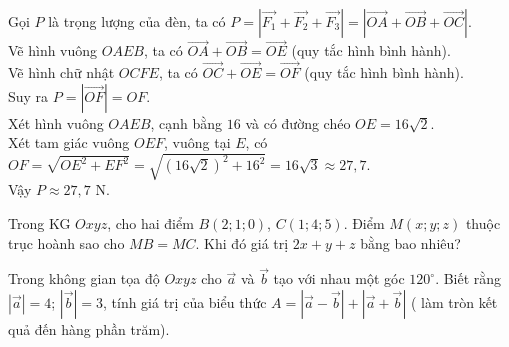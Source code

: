 \begin{ex}
{\begin{center}
\end{center}
Gọi $P$ là trọng lượng của đèn, ta có $P=\left|\overrightarrow{F_1}+\overrightarrow{F_2}+\overrightarrow{F_3}\right|=\left|\overrightarrow{OA}+\overrightarrow{OB}+\overrightarrow{OC}\right|$.\\
Vẽ hình vuông $OAEB$, ta có $\overrightarrow{OA}+\overrightarrow{OB}=\overrightarrow{OE}$ (quy tắc hình bình hành).\\
Vẽ hình chữ nhật $OCFE$, ta có $\overrightarrow{OC}+\overrightarrow{OE}=\overrightarrow{OF}$ (quy tắc hình bình hành).\\
Suy ra $P=\left|\overrightarrow{OF}\right|=OF$.\\
Xét hình vuông $OAEB$, cạnh bằng $16$ và có đường chéo $OE=16\sqrt{2}$.\\
Xét tam giác vuông $OEF$, vuông tại $E$, có $OF=\sqrt{OE^2+EF^2}=\sqrt{\left(16\sqrt{2}\right)^2+16^2}=16\sqrt{3}\approx 27{,}7$.\\
Vậy $P\approx 27{,}7$ N.
 }
\end{ex}

\begin{ex}%
Trong KG $Oxyz$, cho hai điểm $B(2; 1; 0)$, $C(1; 4; 5)$. Điểm $M(x; y; z)$ thuộc trục hoành sao cho $MB=MC$. Khi đó giá trị $2x+y+z$ bằng bao nhiêu?
\end{ex}

\begin{ex}%
Trong không gian tọa độ $Oxyz$ cho $\overrightarrow{a}$ và $\overrightarrow{b}$ tạo với nhau một góc $120^{\circ}$. Biết rằng $|\overrightarrow{a}|=4$; $|\overrightarrow{b}|=3$, tính giá trị của biểu thức $A=|\overrightarrow{a}-\overrightarrow{b}|+|\overrightarrow{a}+\overrightarrow{b}|$ ( làm tròn kết quả đến hàng phần trăm).

\end{ex}

